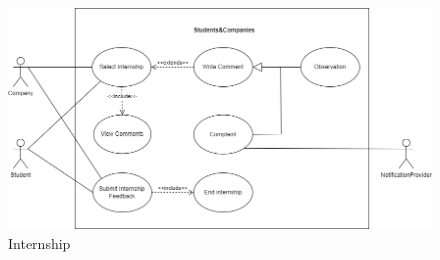 \documentclass[a4paper,12pt]{article}
\begin{document}
\begin{figure}[H]
    \centering
    \includegraphics[scale = 0.45]{figures/UseCasesDiagrams/InternshipUC.drawio.png}
    \caption{Internship}
    \centering
\end{figure}
\newpage
\end{document}
